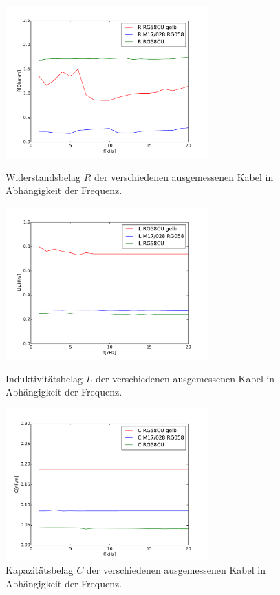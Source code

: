 \begin{figure}
	\begin{minipage}{7.8cm}
		\includegraphics[width = 7.8cm]{data/a/R.pdf}
		\caption[]{Widerstandsbelag $R$ der verschiedenen ausgemessenen Kabel in Abhängigkeit der Frequenz.}
		\label{fig_konst1}
	\end{minipage}
	\begin{minipage}{7.8cm}
		\includegraphics[width = 7.8cm]{data/a/L.pdf}
		\caption[]{Induktivitätsbelag $L$ der verschiedenen ausgemessenen Kabel in Abhängigkeit der Frequenz.}
		\label{fig_konst2}
	\end{minipage}
	\begin{minipage}{7.8cm}
		\includegraphics[width = 7.8cm]{data/a/C.pdf}
		\caption[]{Kapazitätsbelag $C$ der verschiedenen ausgemessenen Kabel in Abhängigkeit der Frequenz.}
		\label{fig_konst3}

\end{minipage}
\end{figure}

